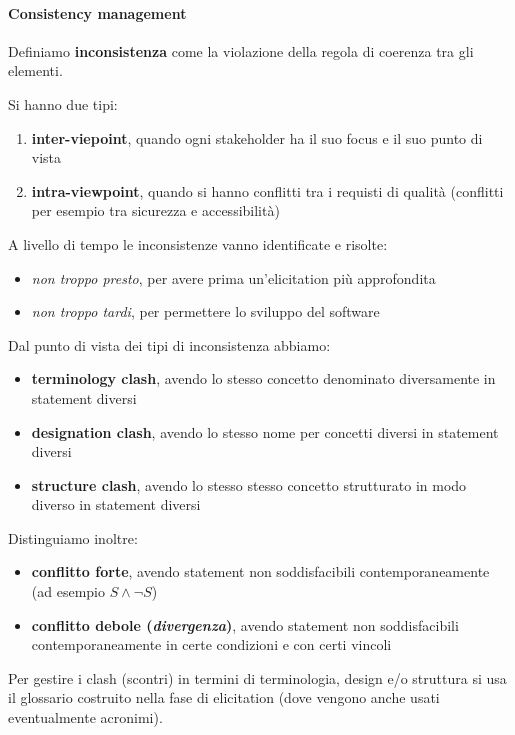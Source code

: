 \documentclass[a4paper,12pt, oneside]{book}
\begin{document}
\paragraph{Consistency management}
\begin{definizione}
  Definiamo \textbf{inconsistenza} come la violazione della regola di coerenza
  tra gli elementi.
\end{definizione}
Si hanno due tipi:
\begin{enumerate}
  \item \textbf{inter-viepoint}, quando ogni stakeholder ha il suo focus e il
  suo punto di vista
  \item \textbf{intra-viewpoint}, quando si hanno conflitti tra i requisti di
  qualità (conflitti per esempio tra sicurezza e accessibilità)
\end{enumerate}
A livello di tempo le inconsistenze vanno identificate e risolte:
\begin{itemize}
  \item \textit{non troppo presto}, per avere prima un'elicitation più
  approfondita 
  \item \textit{non troppo tardi}, per permettere lo sviluppo del software
\end{itemize}
Dal punto di vista dei tipi di inconsistenza abbiamo:
\begin{itemize}
  \item \textbf{terminology clash}, avendo lo stesso concetto denominato
  diversamente in statement diversi
  \item \textbf{designation clash}, avendo lo stesso nome per concetti diversi
  in statement diversi
  \item \textbf{structure clash}, avendo lo stesso stesso concetto strutturato
  in modo diverso in statement diversi
\end{itemize}
Distinguiamo inoltre:
\begin{itemize}
  \item \textbf{conflitto forte}, avendo statement non soddisfacibili
  contemporaneamente (ad esempio $S\land \neg S$)
  \item \textbf{conflitto debole (\textit{divergenza})}, avendo statement non
  soddisfacibili contemporaneamente in certe condizioni e con certi vincoli
\end{itemize}
Per gestire i clash (scontri) in termini di terminologia, design e/o struttura
si usa il glossario costruito nella fase di elicitation (dove vengono anche
usati eventualmente acronimi).\\
\end{document}
